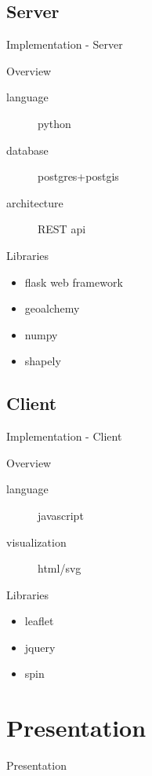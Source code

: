\documentclass[ucs,9pt]{beamer}
\begin{document}
\subsection{Server}
\begin{frame}{Implementation - Server}
  \begin{block}{Overview}
    \begin{description}
      \item [language] python
      \item [database] postgres+postgis
      \item [architecture] REST api
    \end{description}
  \end{block}

  \begin{block}{Libraries}
    \begin{itemize}
      \item flask web framework
      \item geoalchemy
      \item numpy
      \item shapely
    \end{itemize}
  \end{block}
\end{frame}

\subsection{Client}
\begin{frame}{Implementation - Client}
  \begin{block}{Overview}
    \begin{description}
      \item [language] javascript
      \item [visualization] html/svg
    \end{description}
  \end{block}

  \begin{block}{Libraries}
    \begin{itemize}
      \item leaflet
      \item jquery
      \item spin
    \end{itemize}
  \end{block}
\end{frame}

\section{Presentation}
\begin{frame}{Presentation}
\end{frame}
\end{document}
